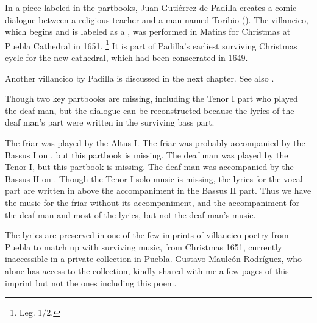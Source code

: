In a piece labeled  in the partbooks, Juan Gutiérrez de Padilla 
creates a comic dialogue between a religious teacher and a  man 
named Toribio ().
The villancico, which begins  and is labeled as a 
, was performed in Matins for Christmas at Puebla 
Cathedral in 1651.%
\footnote{\signature{MEX-Pc}{Leg. 1/2}.}%
    \Autocites{Stanford:Catalog}{Puebla:Microfilm}
It is part of Padilla's earliest surviving Christmas cycle for the new 
cathedral, which had been consecrated in 1649.%
    \begin{Footnote}
        Another villancico by Padilla is discussed in the next chapter. 
        See also \autocites{Cashner:Cards}{Mauleon:PadillaPalafox}.
    \end{Footnote}
Though two key partbooks are missing, including the Tenor I part who played the 
deaf man, but the dialogue can be reconstructed because the lyrics of the deaf 
man's part were written in the surviving bass part.%
\begin{Footnote}
    The friar was played by the Altus I. 
    The friar was probably accompanied by the Bassus I on , but 
    this partbook is missing.
    The deaf man was played by the Tenor I, but this partbook is missing.
    The deaf man was accompanied by the Bassus II on .
    Though the Tenor I solo music is missing, the lyrics for the vocal part are 
    written in above the accompaniment in the Bassus II part. 
    Thus we have the music for the friar without its accompaniment, and the 
    accompaniment for the deaf man and most of the lyrics, but not the deaf man's 
    music.

    The lyrics are preserved in one of the few imprints of villancico poetry 
    from Puebla to match up with surviving music, from Christmas 1651, currently 
    inaccessible in a private collection in Puebla.
    Gustavo Mauleón Rodríguez, who alone has access to the collection, kindly 
    shared with me a few pages of this imprint but not the ones including this 
    poem. %
\end{Footnote}


